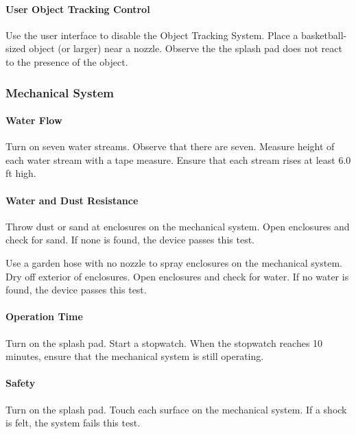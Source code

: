 \paragraph{User Object Tracking Control}
Use the user interface to disable the Object Tracking System. Place a basketball-sized object (or larger) near a nozzle. Observe the the splash pad does not react to the presence of the object. 

\subsubsection{Mechanical System}

\paragraph{Water Flow}
Turn on seven water streams. Observe that there are seven. Measure height of each water stream with a tape measure. Ensure that each stream rises at least 6.0 ft high.

\paragraph{Water and Dust Resistance}
Throw dust or sand at enclosures on the mechanical system. Open enclosures and check for sand. If none is found, the device passes this test. 

Use a garden hose with no nozzle to spray enclosures on the mechanical system. Dry off exterior of enclosures. Open enclosures and check for water. If no water is found, the device passes this test. 

\paragraph{Operation Time}
Turn on the splash pad. Start a stopwatch. When the stopwatch reaches 10 minutes, ensure that the mechanical system is still operating. 

\paragraph{Safety}
Turn on the splash pad. Touch each surface on the mechanical system. If a shock is felt, the system fails this test. 

